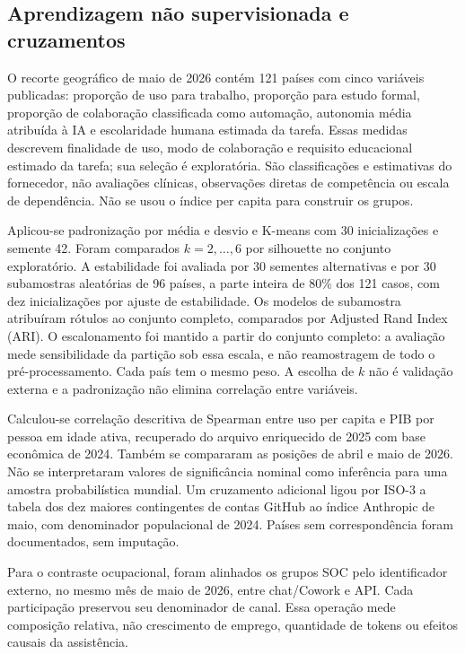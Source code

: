 \documentclass[11pt,a4paper]{article}
\begin{document}
\subsection{Aprendizagem não supervisionada e cruzamentos}
O recorte geográfico de maio de 2026 contém 121 países com cinco variáveis publicadas: proporção de uso para trabalho, proporção para estudo formal, proporção de colaboração classificada como automação, autonomia média atribuída à IA e escolaridade humana estimada da tarefa. Essas medidas descrevem finalidade de uso, modo de colaboração e requisito educacional estimado da tarefa; sua seleção é exploratória. São classificações e estimativas do fornecedor, não avaliações clínicas, observações diretas de competência ou escala de dependência. Não se usou o índice per capita para construir os grupos.

Aplicou-se padronização por média e desvio e K-means com 30 inicializações e semente 42. Foram comparados $k=2,\ldots,6$ por silhouette no conjunto exploratório. A estabilidade foi avaliada por 30 sementes alternativas e por 30 subamostras aleatórias de 96 países, a parte inteira de 80\% dos 121 casos, com dez inicializações por ajuste de estabilidade. Os modelos de subamostra atribuíram rótulos ao conjunto completo, comparados por Adjusted Rand Index (ARI). O escalonamento foi mantido a partir do conjunto completo: a avaliação mede sensibilidade da partição sob essa escala, e não reamostragem de todo o pré-processamento. Cada país tem o mesmo peso. A escolha de $k$ não é validação externa e a padronização não elimina correlação entre variáveis.

Calculou-se correlação descritiva de Spearman entre uso per capita e PIB por pessoa em idade ativa, recuperado do arquivo enriquecido de 2025 com base econômica de 2024. Também se compararam as posições de abril e maio de 2026. Não se interpretaram valores de significância nominal como inferência para uma amostra probabilística mundial. Um cruzamento adicional ligou por ISO-3 a tabela dos dez maiores contingentes de contas GitHub ao índice Anthropic de maio, com denominador populacional de 2024. Países sem correspondência foram documentados, sem imputação.

Para o contraste ocupacional, foram alinhados os grupos SOC pelo identificador externo, no mesmo mês de maio de 2026, entre chat/Cowork e API. Cada participação preservou seu denominador de canal. Essa operação mede composição relativa, não crescimento de emprego, quantidade de tokens ou efeitos causais da assistência.
\end{document}
